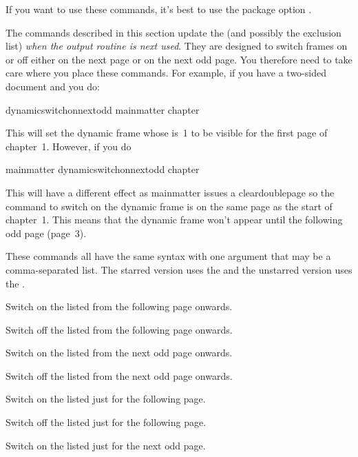 \documentclass[fontsize=12pt]{scrbook}
\begin{document}
\begin{important}
If you want to use these commands, it's best to use the package
option .
\end{important}

The commands described in this section update the 
(and possibly the exclusion list) \emph{when the output routine is
next used}. They are designed to switch frames on or off either on
the next page or on the next odd page. You therefore need to take
care where you place these commands. For example, if you have a
two-sided document and you do:
\begin{codebox}
\gls{dynamicswitchonnextodd}
\gls{mainmatter}
\gls{chapter}
\end{codebox}
This will set the dynamic frame whose  is~1 to be visible for
the first page of chapter~1. However, if you do
\begin{codebox}
\gls{mainmatter}
\gls{dynamicswitchonnextodd}
\gls{chapter}
\end{codebox}
This will have a different effect as \gls{mainmatter} issues a
\gls{cleardoublepage} so the command to switch on the dynamic
frame is on the same page as the start of chapter~1. This means that
the dynamic frame won't appear until the following odd page
(page~3).

These commands all have the same syntax with one argument that may
be a comma-separated list. The starred version uses
the  and the unstarred version uses the .

Switch on the listed  from the following page onwards.

Switch off the listed  from the following page onwards.

Switch on the listed  from the next odd page onwards.

Switch off the listed  from the next odd page onwards.

Switch on the listed  just for the following page.

Switch off the listed  just for the following page.

Switch on the listed  just for the next odd page.
\end{document}
